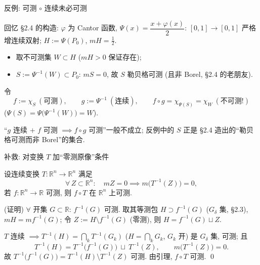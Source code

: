 
\begin{frame}{反例: 可测 $\circ$ 连续未必可测}

回忆 \S 2.4 的构造: $\varphi$ 为 Cantor 函数,
$\Psi(x) = \dfrac{x + \varphi(x)}{2}$: $[0,1] \to [0,1]$ \alert{严格增连续双射};
$H := \Psi(P_0)$, $mH = \frac12$.

\pause

\begin{itemize}
\item 取\alert{不可测}集 $W \subset H$ ($mH > 0$ 保证存在);
\item $S := \Psi^{-1}(W) \subset P_0$: $mS = 0$, 故 $S$ \alert{勒贝格可测}
  (且非 Borel, \S 2.4 的老朋友).
\end{itemize}

\pause

令
\[
f := \chi_S\ (\text{可测}),
\qquad
g := \Psi^{-1}\ (\text{连续}),
\qquad
f \circ g = \chi_{\Psi(S)} = \chi_W\ (\text{不可测!})
\]
($\Psi(S) = \Psi\big(\Psi^{-1}(W)\big) = W$).

\pause

\begin{attnblock}
``$g$ 连续 $+$ $f$ 可测 $\implies f \circ g$ 可测''一般不成立; 反例中的 $S$ 正是
\S 2.4 造出的``勒贝格可测而非 Borel''的集合.
\end{attnblock}

\end{frame}


\begin{frame}{补救: 对变换 $T$ 加``零测原像''条件}

\begin{thm}
设连续变换 $T: \mathbb{R}^n \to \mathbb{R}^n$ 满足
\[
\forall\, Z \subset \mathbb{R}^n:\quad mZ = 0 \implies m\big(T^{-1}(Z)\big) = 0,
\]
若 $f: \mathbb{R}^n \to \mathbb{R}$ 可测, 则 $f \circ T$ 在 $\mathbb{R}^n$ 上可测.
\end{thm}

\startproof[bg=yellow, fg=red](证明)
$\forall$ 开集 $G \subset \mathbb{R}$: $f^{-1}(G)$ 可测. 取其\alert{等测包} $H \supset f^{-1}(G)$
($G_\delta$ 集, \S 2.3), $mH = m f^{-1}(G)$; 令 $Z := H \setminus f^{-1}(G)$ (零测),
则 $H = f^{-1}(G) \sqcup Z$.

\pause

$T$ 连续 $\implies T^{-1}(H) = \bigcap_k T^{-1}(G_k)$ ($H = \bigcap_k G_k$, $G_k$ 开) 是
$G_\delta$ 集, 可测; 且
\[
T^{-1}(H) = T^{-1}\big(f^{-1}(G)\big) \ \sqcup\ T^{-1}(Z),
\qquad
m\big(T^{-1}(Z)\big) = 0 .
\]
故 $T^{-1}\big(f^{-1}(G)\big) = T^{-1}(H) \setminus T^{-1}(Z)$ 可测. 由引理, $f \circ T$ 可测.
\qed

\end{frame}

